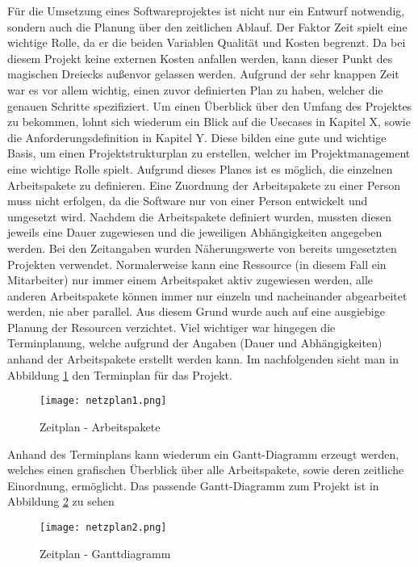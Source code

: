 Für die Umsetzung eines Softwareprojektes ist nicht nur ein Entwurf notwendig, sondern auch die Planung über den zeitlichen Ablauf. Der Faktor Zeit spielt eine wichtige Rolle, da er die beiden Variablen Qualität und Kosten begrenzt. Da bei diesem Projekt keine externen Kosten anfallen werden, kann dieser Punkt des magischen Dreiecks außenvor gelassen werden.
Aufgrund der sehr knappen Zeit war es vor allem wichtig, einen zuvor definierten Plan zu haben, welcher die genauen Schritte spezifiziert. Um einen Überblick über den Umfang des Projektes zu bekommen, lohnt sich wiederum ein Blick auf die Usecases in Kapitel X, sowie die Anforderungsdefinition in Kapitel Y. Diese bilden eine gute und wichtige Basis, um einen Projektstrukturplan zu erstellen, welcher im Projektmanagement eine wichtige Rolle spielt. Aufgrund dieses Planes ist es möglich, die einzelnen Arbeitspakete zu definieren. Eine Zuordnung der Arbeitspakete zu einer Person muss nicht erfolgen, da die Software nur von einer Person entwickelt und umgesetzt wird. Nachdem die Arbeitspakete definiert wurden, mussten diesen jeweils eine Dauer zugewiesen und die jeweiligen Abhängigkeiten angegeben werden.
Bei den Zeitangaben wurden Näherungswerte von bereits umgesetzten Projekten verwendet.
Normalerweise kann eine Ressource (in diesem Fall ein Mitarbeiter) nur immer einem Arbeitspaket aktiv zugewiesen werden, alle anderen Arbeitspakete können immer nur einzeln und nacheinander abgearbeitet werden, nie aber parallel. Aus diesem Grund wurde auch auf eine ausgiebige Planung der Resourcen verzichtet. Viel wichtiger war hingegen die Terminplanung, welche aufgrund der Angaben (Dauer und Abhängigkeiten) anhand der Arbeitspakete erstellt werden kann.
Im nachfolgenden sieht man in Abbildung \ref{fig:zeitnetz1} den Terminplan für das Projekt.

\begin{figure}[H]
\centering
\texttt{[image: netzplan1.png]}
\caption{Zeitplan - Arbeitspakete}
\label{fig:zeitnetz1}
\end{figure}

Anhand des Terminplans kann wiederum ein Gantt-Diagramm erzeugt werden, welches einen grafischen Überblick über alle Arbeitspakete, sowie deren zeitliche Einordnung, ermöglicht. Das passende Gantt-Diagramm zum Projekt ist in Abbildung \ref{fig:zeitnetz2} zu sehen

\begin{figure}[H]
\centering
\texttt{[image: netzplan2.png]}
\caption{Zeitplan - Ganttdiagramm}
\label{fig:zeitnetz2}
\end{figure}

